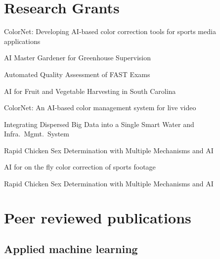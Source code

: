 \documentclass[11pt,letterpaper,roman]{moderncv}        %
\begin{document}

\section{Research Grants}
\quad ColorNet: Developing AI-based color correction tools for sports media applications

\quad AI Master Gardener for Greenhouse Supervision

\quad Automated Quality Assessment of FAST Exams

\quad AI for Fruit and Vegetable Harvesting in South Carolina

\quad ColorNet: An AI-based color management system for live video

\quad Integrating Dispersed Big Data into a Single Smart Water and Infra.~Mgmt.~System

\quad Rapid Chicken Sex Determination with Multiple Mechanisms and AI

\quad AI for on the fly color correction of sports footage

\quad Rapid Chicken Sex Determination with Multiple Mechanisms and AI


\section{Peer reviewed publications}
\subsection{Applied machine learning}

\begin{refsection}
  \nocite{*}
  \printbibliography[heading=none]
\end{refsection}
\end{document}
